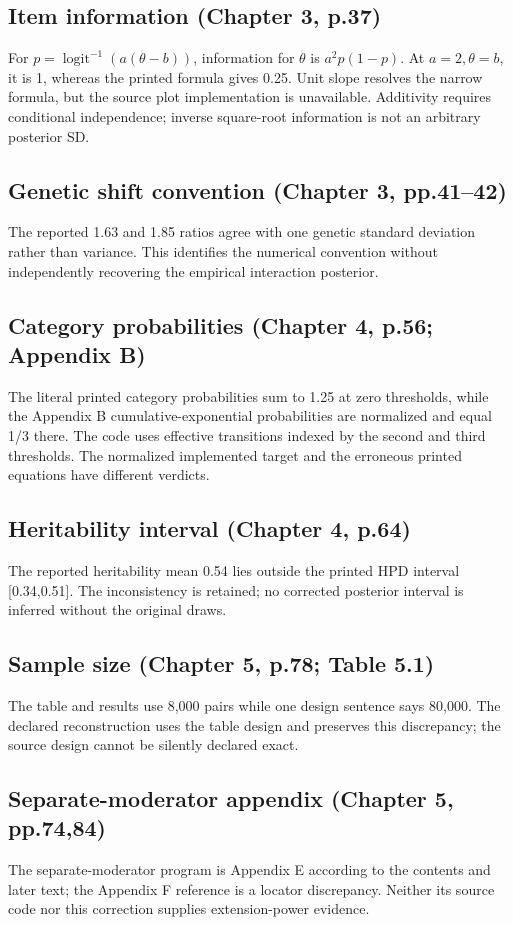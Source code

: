 \documentclass[11pt]{article}
\begin{document}
\subsection{Item information (Chapter 3, p.37)}
For $p=\operatorname{logit}^{-1}(a(\theta-b))$, information for $\theta$ is $a^2p(1-p)$. At $a=2,\theta=b$, it is 1, whereas the printed formula gives 0.25. Unit slope resolves the narrow formula, but the source plot implementation is unavailable. Additivity requires conditional independence; inverse square-root information is not an arbitrary posterior SD.
\subsection{Genetic shift convention (Chapter 3, pp.41--42)}
The reported 1.63 and 1.85 ratios agree with one genetic standard deviation rather than variance. This identifies the numerical convention without independently recovering the empirical interaction posterior.
\subsection{Category probabilities (Chapter 4, p.56; Appendix B)}
The literal printed category probabilities sum to 1.25 at zero thresholds, while the Appendix B cumulative-exponential probabilities are normalized and equal 1/3 there. The code uses effective transitions indexed by the second and third thresholds. The normalized implemented target and the erroneous printed equations have different verdicts.
\subsection{Heritability interval (Chapter 4, p.64)}
The reported heritability mean 0.54 lies outside the printed HPD interval [0.34,0.51]. The inconsistency is retained; no corrected posterior interval is inferred without the original draws.
\subsection{Sample size (Chapter 5, p.78; Table 5.1)}
The table and results use 8,000 pairs while one design sentence says 80,000. The declared reconstruction uses the table design and preserves this discrepancy; the source design cannot be silently declared exact.
\subsection{Separate-moderator appendix (Chapter 5, pp.74,84)}
The separate-moderator program is Appendix E according to the contents and later text; the Appendix F reference is a locator discrepancy. Neither its source code nor this correction supplies extension-power evidence.
\end{document}
